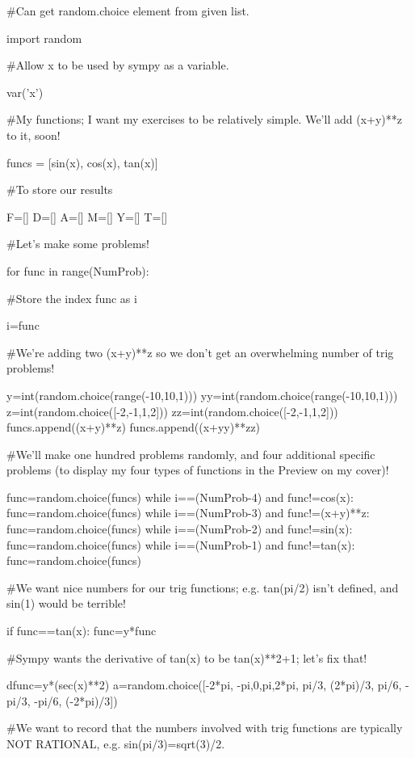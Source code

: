 \documentclass[ebook,12pt,oneside,openany]{memoir} %
\begin{document}
\begin{sympycode}











#Can get random.choice element from given list.

import random


#Allow x to be used by sympy as a variable.

var('x')


#My functions; I want my exercises to be relatively simple.  We'll add (x+y)**z to it, soon!

funcs = [sin(x), cos(x), tan(x)]


#To store our results

F=[]
D=[]
A=[]
M=[]
Y=[]
T=[]


#Let's make some problems!  

for func in range(NumProb):


#Store the index func as i

	i=func 


#We're adding two (x+y)**z so we don't get an overwhelming number of trig problems! 

	y=int(random.choice(range(-10,10,1)))
	yy=int(random.choice(range(-10,10,1)))
	z=int(random.choice([-2,-1,1,2]))
	zz=int(random.choice([-2,-1,1,2]))
	funcs.append((x+y)**z)
	funcs.append((x+yy)**zz)  


#We'll make one hundred problems randomly, and four additional specific problems (to display my four types of functions in the Preview on my cover)!

	func=random.choice(funcs)
	while i==(NumProb-4) and func!=cos(x):
			func=random.choice(funcs)
	while i==(NumProb-3) and func!=(x+y)**z:
		func=random.choice(funcs)
	while i==(NumProb-2) and func!=sin(x):
		func=random.choice(funcs)
	while i==(NumProb-1) and func!=tan(x):
		func=random.choice(funcs)


#We want nice numbers for our trig functions; e.g. tan(pi/2) isn't defined, and sin(1) would be terrible!

	if func==tan(x):
		func=y*func


#Sympy wants the derivative of tan(x) to be tan(x)**2+1; let's fix that!

		dfunc=y*(sec(x)**2)
		a=random.choice([-2*pi, -pi,0,pi,2*pi, pi/3, (2*pi)/3, pi/6, -pi/3, -pi/6, (-2*pi)/3])


#We want to record that the numbers involved with trig functions are typically NOT RATIONAL, e.g. sin(pi/3)=sqrt(3)/2.


\end{sympycode}
\end{document}
